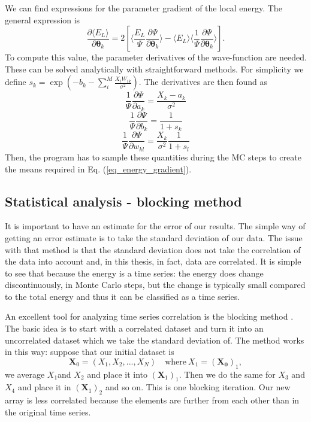We can find expressions for the parameter gradient of the local energy. The general expression is
\begin{equation}
\frac{\partial\langle E_{L}\rangle}{\partial \boldsymbol{\theta}_k} = 2 \left[ \langle \frac{E_{L}}{\Psi}   \frac{\partial\Psi}{\partial\boldsymbol{\theta}_k} \rangle - \langle E_{L} \rangle \langle \frac{1}{\Psi}\frac{\partial\Psi}{\partial\boldsymbol{\theta}_k} \rangle  \right].
\label{eq_energy_gradient}
\end{equation}
To compute this value, the parameter derivatives of the wave-function are needed. These can be solved analytically with straightforward methods. For simplicity we define $s_k = \exp(-b_k-\sum_i^M\frac{X_iW_{ik}}{\sigma^2})$. The derivatives are then found as
\begin{equation*}
\frac{1}{\Psi}\frac{\partial\Psi}{\partial a_k} = \frac{X_k-a_k}{\sigma^2}
\label{eq_grad_ak}
\end{equation*}
\begin{equation*}
\frac{1}{\Psi}\frac{\partial\Psi}{\partial b_k} = \frac{1}{1 + s_k}
\label{eq_grad_bk}
\end{equation*}
\begin{equation*}
\frac{1}{\Psi}\frac{\partial \Psi}{\partial w_{kl}} = \frac{X_k}{\sigma^2} \frac{1}{1+s_l}
\label{eq_grad_wk}
\end{equation*}
Then, the program has to sample these quantities during the MC steps to create the means required in Eq. (\ref{eq_energy_gradient}).

\subsection{Statistical analysis - blocking method}
It is important to have an estimate for the error of our results. The simple way of getting an error estimate is to take the standard deviation of our data. The issue with that method is that the standard deviation does not take the correlation of the data into account and, in this thesis, in fact, data are correlated. It is simple to see that because the energy is a time series: the energy does change discontinuously, in Monte Carlo steps, but the change is typically small compared to the total energy and thus it can be classified as a time series.

An excellent tool for analyzing time series correlation is the blocking method \cite{marius}. The basic idea is to start with a correlated dataset and turn it into an uncorrelated dataset which we take the standard deviation of. The method works in this way: suppose that our initial dataset is 
\begin{equation*}
\textbf{X}_0 = (X_1,X_2,...,X_N)\quad \text{where}\ X_1=(\mathbf{X_0})_1,
\end{equation*}
we average $X_1$and $X_2$ and place it into $(\textbf{X}_1)_1$. Then we do the same for $X_3$ and $X_4$ and place it in $(\textbf{X}_1)_2$ and so on. This is one blocking iteration. Our new array is less correlated because the elements are further from each other than in the original time series.

